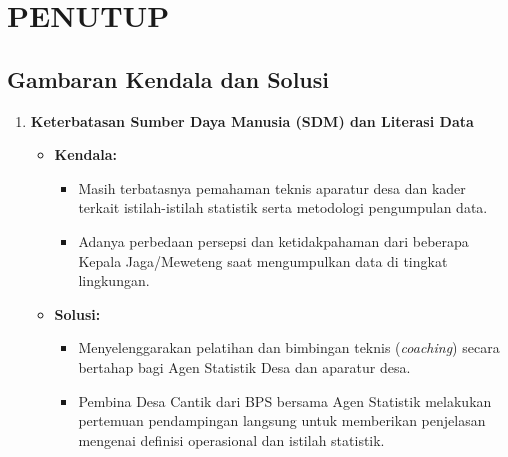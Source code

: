 
\chapter{PENUTUP}

\section{Gambaran Kendala dan Solusi}

\begin{enumerate}[label=\textbf{\textcolor{bpsnavy}{\arabic*.}}]
  \item \textbf{Keterbatasan Sumber Daya Manusia (SDM) dan Literasi Data}
  \begin{itemize}
    \item \textbf{\textcolor{ribbonred}{Kendala:}}
    \begin{itemize}
      \item Masih terbatasnya pemahaman teknis aparatur desa dan kader terkait istilah-istilah statistik serta metodologi pengumpulan data.
      \item Adanya perbedaan persepsi dan ketidakpahaman dari beberapa Kepala Jaga/Meweteng saat mengumpulkan data di tingkat lingkungan.
    \end{itemize}
    \item \textbf{\textcolor{bpsgreen}{Solusi:}}
    \begin{itemize}
      \item Menyelenggarakan pelatihan dan bimbingan teknis (\textit{coaching}) secara bertahap bagi Agen Statistik Desa dan aparatur desa.
      \item Pembina Desa Cantik dari BPS bersama Agen Statistik melakukan pertemuan pendampingan langsung untuk memberikan penjelasan mengenai definisi operasional dan istilah statistik.
    \end{itemize}
  \end{itemize}


\end{enumerate}
